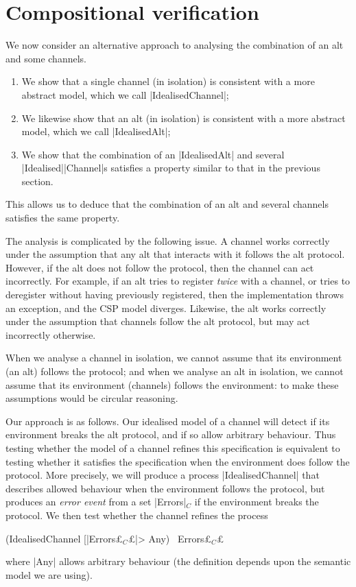 \section{Compositional verification}

\inlineCSP

We now consider an alternative approach to analysing the combination of an alt
and some channels.
%
\begin{enumerate}
\item We show that a single channel (in isolation) is consistent with a more
  abstract model, which we call |IdealisedChannel|;

\item We likewise show that an alt (in isolation) is consistent with a more
  abstract model, which we call |IdealisedAlt|;

\item We show that the combination of an |IdealisedAlt| and several
  |Idealised|\-|Channel|s satisfies a property similar to that in the previous
  section. 
\end{enumerate}
%
This allows us to deduce that the combination of an alt and several channels
satisfies the same property. 

The analysis is complicated by the following issue.  A channel works correctly
under the assumption that any alt that interacts with it follows the alt
protocol.  However, if the alt does not follow the protocol, then the channel
can act incorrectly.  For example, if an alt tries to register \emph{twice}
with a channel, or tries to deregister without having previously registered,
then the implementation throws an exception, and the CSP model diverges.
Likewise, the alt works correctly under the assumption that channels follow
the alt protocol, but may act incorrectly otherwise.

When we analyse a channel in isolation, we cannot assume that its environment
(an alt) follows the protocol; and when we analyse an alt in isolation, we
cannot assume that its environment (channels) follows the environment: to make
these assumptions would be circular reasoning. 

Our approach is as follows.  Our idealised model of a channel will detect if
its environment breaks the alt protocol, and if so allow arbitrary behaviour.
Thus testing whether the model of a channel refines this specification is
equivalent to testing whether it satisfies the specification when the
environment does follow the protocol.  More precisely, we will produce a
process |IdealisedChannel| that describes allowed behaviour when the environment
follows the protocol, but produces an \emph{error event} from a set
|Errors|$_C$ if the environment breaks the protocol.  We then test whether the
channel refines the process
%
\begin{cspm}
(IdealisedChannel [|Errors£$_C$£|> Any) \ Errors£$_C$£
\end{cspm}
%
where |Any| allows arbitrary behaviour (the definition depends upon the
semantic model we are using).  

